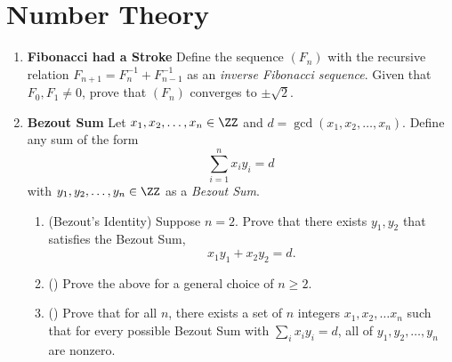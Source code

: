 \documentclass[11pt]{scrartcl}
\begin{document}
\section{Number Theory}
\begin{enumerate}[label=\textbf{N\arabic*}.]
    \item \textbf{Fibonacci had a Stroke} \newline
    Define the sequence $(F_n)$ with the recursive relation $F_{n+1} = F_{n}^{-1} + F_{n-1}^{-1}$ as an \textit{inverse Fibonacci sequence}. Given that $F_0, F_1 \neq 0$, prove that $(F_n)$ converges to $\pm \sqrt{2}$.

    \item \textbf{Bezout Sum} \newline
    Let $x_1, x_2, \dots, x_n \in \ZZ$ and $d = \gcd(x_1, x_2, \dots, x_n)$. Define any sum of the form
    \[ \sum_{i = 1}^{n} x_i y_i = d \]
    with $y_1, y_2, \dots, y_n \in \ZZ$ as a \textit{Bezout Sum}.

    \begin{enumerate}
        \item (Bezout's Identity) Suppose $n = 2$. Prove that there exists $y_1, y_2$ that satisfies the Bezout Sum,     
        \[ x_1y_1 + x_2y_2 = d. \]

        \item (\halfchili) Prove the above for a general choice of $n \geq 2$.

        \item (\fullchili) Prove that for all $n$, there exists a set of $n$ integers $x_1, x_2, \dots x_n$ such that for every possible Bezout Sum with $\sum_i x_i y_i = d$, all of $y_1, y_2, \dots, y_n$ are nonzero.
    \end{enumerate}
    
\end{enumerate}
\end{document}
